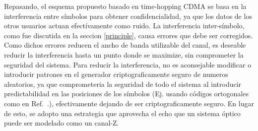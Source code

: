 Repasando, el esquema propuesto basado en time-hopping CDMA se basa en la interferencia entre símbolos para obtener confidencialidad, ya que los datos de los otros usuarios actuan efectívamente como ruido.
La interferencia inter-símbolo, como fue discutida en la seccion \ref{principle}, causa errores que debe ser corregidos. Como dichos errores reducen el ancho de banda utilizable del canal, es deseable reducir la interferencia hasta un punto donde se maximize, sin comprometer la seguridad del sistema. Para reducir la interferencia, no es aconsejable modificar o introducir patrones en el generador criptograficamente seguro de numeros aleatorios, ya que comprometeria la seguridad de todo el sistema al introducir predictabilidad en las posiciones de los símbolos (Ej. usando códigos ortogonales como en Ref.~\cite{Nadarajah2006}.), efectivamente dejando de ser criptograficamente seguro.
En lugar de esto, se adopto una estrategia que aprovecha el echo que un sistema óptico puede ser modelado como un canal-Z.


